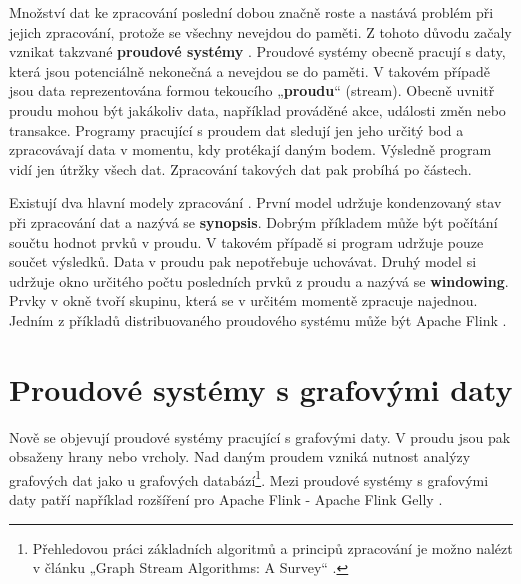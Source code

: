 Množství dat ke zpracování poslední dobou značně roste a nastává problém při jejich zpracování, protože se všechny nevejdou do paměti.  
Z tohoto důvodu začaly vznikat takzvané \textbf{proudové systémy} \citep{streaming}.
Proudové systémy obecně pracují s daty, která jsou potenciálně nekonečná a nevejdou se do paměti.
V takovém případě jsou data reprezentována formou tekoucího „\textbf{proudu}“ (stream).
Obecně uvnitř proudu mohou být jakákoliv data, například prováděné akce, události změn nebo transakce.
Programy pracující s proudem dat sledují jen jeho určitý bod a zpracovávají data v momentu, kdy protékají daným bodem.
Výsledně program vidí jen útržky všech dat.
Zpracování takových dat pak probíhá po částech.

Existují dva hlavní modely zpracování \citep{graphstreaming}.
První model udržuje kondenzovaný stav při zpracování dat a nazývá se \textbf{synopsis}.
Dobrým příkladem může být počítání součtu hodnot prvků v proudu.
V takovém případě si program udržuje pouze součet výsledků.
Data v proudu pak nepotřebuje uchovávat.
Druhý model si udržuje okno určitého počtu posledních prvků z proudu a nazývá se \textbf{windowing}.
Prvky v okně tvoří skupinu, která se v určitém momentě zpracuje najednou.
Jedním z příkladů distribuovaného proudového systému může být Apache Flink \citep{apacheflink}.

\section*{Proudové systémy s grafovými daty}

Nově se objevují proudové systémy pracující s grafovými daty.
V proudu jsou pak obsaženy hrany nebo vrcholy. 
Nad daným proudem vzniká nutnost analýzy grafových dat jako u grafových databází\footnote{Přehledovou práci základních algoritmů a principů zpracování je možno nalézt v článku „Graph Stream Algorithms: A Survey“ \citep{graphstreamalgorithms}.}.
Mezi proudové systémy s grafovými daty patří například rozšíření pro Apache Flink - Apache Flink Gelly \citep{apacheflinkgelly}.

